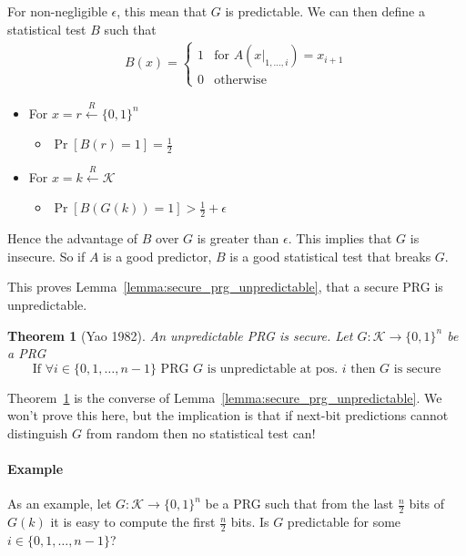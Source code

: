\documentclass[10pt,a4paper]{report}
\newtheorem{theorem}{Theorem}[section]
\begin{document}
For non-negligible $\epsilon$, this mean that $G$ is predictable. We can then define a statistical
test $B$ such that
\begin{equation*}
\begin{aligned}
    B(x) = \left\{
        \begin{array}{ll}
            1 & \text{for } A(x|_{1, \ldots, i}) = x_{i+1}\\
            0 & \text{otherwise}
        \end{array}
    \right.
\end{aligned}
\end{equation*}

\begin{itemize}[noitemsep]  %
    \item For $x = r \xleftarrow{R} \{0, 1\}^n$
        \begin{itemize}
            \item $\operatorname{Pr}[B(r) = 1] = \tfrac{1}{2}$
        \end{itemize}
    \item For $x = k \xleftarrow{R} \mathcal{K}$
        \begin{itemize}
            \item $\operatorname{Pr}[B(G(k)) = 1] > \tfrac{1}{2} + \epsilon$
        \end{itemize}
\end{itemize}

Hence the advantage of $B$ over $G$ is greater than $\epsilon$. This implies that $G$ is insecure.
So if $A$ is a good predictor, $B$ is a good statistical test that breaks $G$.

This proves Lemma~\ref{lemma:secure_prg_unpredictable}, that a secure PRG is unpredictable.

\begin{theorem}[Yao 1982]
    \label{theorem:yao}
    An unpredictable PRG is secure. Let $G \colon \mathcal{K} \to \{0, 1\}^n$ be a PRG
        $$ \text{If } \forall i \in \{0, 1, \ldots, n-1\} \text{ PRG } G \text{ is
           unpredictable at pos. } i \text{ then } G \text{ is secure} $$
\end{theorem}

Theorem~\ref{theorem:yao} is the converse of Lemma~\ref{lemma:secure_prg_unpredictable}. We won't
prove this here, but the implication is that if next-bit predictions cannot distinguish $G$ from
random then no statistical test can!

\paragraph{Example} As an example, let $G \colon \mathcal{K} \to \{0, 1\}^n$ be a PRG such that
from the last $\tfrac{n}{2}$ bits of $G(k)$ it is easy to compute the first $\tfrac{n}{2}$ bits. Is
$G$ predictable for some $i \in \{0, 1, \ldots, n-1\}$?
\end{document}

